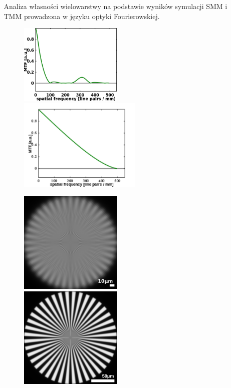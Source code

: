 \documentclass{beamer}
\begin{document}
\begin{frame}
\begin{columns}
\begin{column}{0.5\textwidth}
\begin{figure}
			\end{figure}
		\end{column}
		\begin{column}{0.5\textwidth}
			{\tiny Analiza własności wielowarstwy na podstawie wyników symulacji SMM i TMM prowadzona w języku optyki Fourierowskiej.}
			\begin{figure}
				\includegraphics[width=0.5\textwidth]{images/MTF-example.png}
				\includegraphics[width=0.6\textwidth]{images/MTF-perfect.png}
			\end{figure}
			\begin{figure}
				\includegraphics[width=0.5\textwidth]{images/Spoke.png}
				\includegraphics[width=0.5\textwidth]{images/Spoke-perfect.png}

\end{figure}
\end{column}
\end{columns}
\end{frame}
\end{document}
